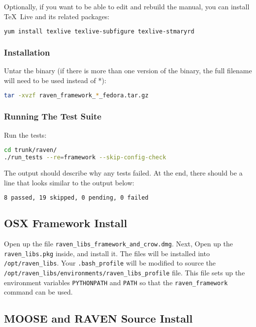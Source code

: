 Optionally, if you want to be able to edit and rebuild the manual, you can 
install \TeX~Live and its related packages:
\begin{lstlisting}[language=bash]
yum install texlive texlive-subfigure texlive-stmaryrd
\end{lstlisting}

\subsubsection{Installation}
Untar the binary (if there is more than one version of the
binary, the full filename will need to be used instead of *):

\begin{lstlisting}[language=bash]
tar -xvzf raven_framework_*_fedora.tar.gz
\end{lstlisting}

\subsubsection{Running The Test Suite}
Run the tests:

\begin{lstlisting}[language=bash]
cd trunk/raven/
./run_tests --re=framework --skip-config-check
\end{lstlisting}

The output should describe why any tests failed.
%
At the end, there should be a line that looks similar to the output below:
\begin{lstlisting}[language=bash]
8 passed, 19 skipped, 0 pending, 0 failed
\end{lstlisting}

\subsection{OSX Framework Install}

Open up the file \texttt{raven\_libs\_framework\_and\_crow.dmg}.
%
Next, Open up the \texttt{raven\_libs.pkg} inside, and install it.
%
The files will be installed into \texttt{/opt/raven\_libs}.
%
Your \texttt{.bash\_profile} will be modified to source the
\texttt{/opt/raven\_libs/environments/raven\_libs\_profile} file.
%
This file sets up the environment variables \texttt{PYTHONPATH} and
\texttt{PATH} so that the \texttt{raven\_framework} command can be used.

\subsection{MOOSE and RAVEN Source Install}

